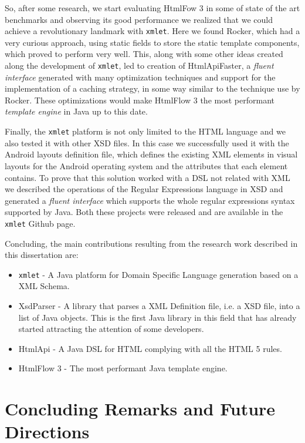 \noindent
So, after some research, we start evaluating HtmlFow 3 in some of state of the art benchmarks and observing its good performance we realized that we could achieve a revolutionary landmark with \texttt{xmlet}. Here we found Rocker, which had a very curious approach, using static fields to store the static template components, which proved to perform very well. This, along with some other ideas created along the development of \texttt{xmlet}, led to creation of HtmlApiFaster, a \textit{fluent interface} generated with many optimization techniques and support for the implementation of a caching strategy, in some way similar to the technique use by Rocker. These optimizations would make HtmlFlow 3 the most performant \textit{template engine} in Java up to this date.

\noindent
Finally, the \texttt{xmlet} platform is not only limited to the \ac{HTML} language and we also tested it with other \ac{XSD} files. In this case we successfully used it with the Android layouts definition file, which defines the existing \ac{XML} elements in visual layouts for the Android operating system and the attributes that each element contains. To prove that this solution worked with a \ac{DSL} not related with \ac{XML} we described the operations of the Regular Expressions language in \ac{XSD} and generated a \textit{fluent interface} which supports the whole regular expressions syntax supported by Java. Both these projects were released and are available in the \texttt{xmlet} Github page.

\noindent
Concluding, the main contributions resulting from the research work described in this dissertation are: 

\begin{itemize}
	\item \texttt{xmlet} - A Java platform for Domain Specific Language generation based on a XML Schema.
	\item XsdParser - A library that parses a \ac{XML} Definition file, i.e. a \ac{XSD} file, into a list of Java objects. This is the first Java library in this field that has already started attracting the attention of some developers.
	\item HtmlApi - A Java \ac{DSL} for \ac{HTML} complying with all the \ac{HTML} 5 rules.
	\item HtmlFlow 3 - The most performant Java template engine.
\end{itemize}

\section{Concluding Remarks and Future Directions}
\label{cha:concludingremarks}

